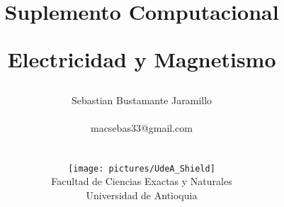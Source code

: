 \documentclass[12pt]{book}
\begin{document}
\title{Suplemento Computacional \\
\begin{Huge}
\textbf{Electricidad y Magnetismo}
\end{Huge}}
\author{ Sebastian Bustamante Jaramillo\\ \begin{small}
macsebas33@gmail.com
\end{small} \\ \vspace{5cm} \\
\texttt{[image: pictures/UdeA\_Shield]} \\
Facultad de Ciencias Exactas y Naturales \\ 
Universidad de Antioquia }
\date{}
\maketitle



\newpage{\pagestyle{empty}\cleardoublepage}  

\tableofcontents
\newpage{\pagestyle{empty}\cleardoublepage}  
















\end{document}
